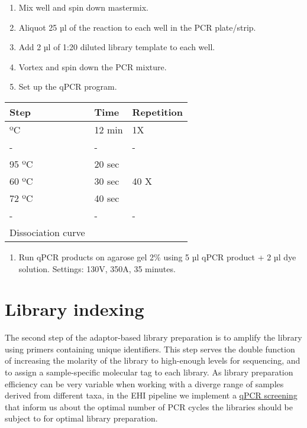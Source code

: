 \documentclass[
]{book}
\providecommand{\tightlist}{%
  \setlength{\itemsep}{0pt}\setlength{\parskip}{0pt}}
\begin{document}
\begin{enumerate}
\def\labelenumi{\arabic{enumi}.}
\setcounter{enumi}{1}
\tightlist
\item
  Mix well and spin down mastermix.
\item
  Aliquot 25 µl of the reaction to each well in the PCR plate/strip.
\item
  Add 2 µl of 1:20 diluted library template to each well.
\item
  Vortex and spin down the PCR mixture.
\item
  Set up the qPCR program.
\end{enumerate}

\begin{longtable}[]{@{}lll@{}}
\toprule\noalign{}
Step & Time & Repetition \\
\midrule\noalign{}
\endhead
\bottomrule\noalign{}
\endlastfoot
95 ºC & 12 min & 1X \\
- & - & - \\
95 ºC & 20 sec & \\
60 ºC & 30 sec & 40 X \\
72 ºC & 40 sec & \\
- & - & - \\
Dissociation curve & & \\
\end{longtable}

\begin{enumerate}
\def\labelenumi{\arabic{enumi}.}
\setcounter{enumi}{6}
\tightlist
\item
  Run qPCR products on agarose gel 2\% using 5 µl qPCR product + 2 µl dye solution. Settings: 130V, 350A, 35 minutes.
\end{enumerate}

\hypertarget{library-indexing}{%
\chapter{Library indexing}\label{library-indexing}}

The second step of the adaptor-based library preparation is to amplify the library using primers containing unique identifiers. This step serves the double function of increasing the molarity of the library to high-enough levels for sequencing, and to assign a sample-specific molecular tag to each library. As library preparation efficiency can be very variable when working with a diverge range of samples derived from different taxa, in the EHI pipeline we implement a \protect\hyperlink{library-preparation-qpcr}{qPCR screening} that inform us about the optimal number of PCR cycles the libraries should be subject to for optimal library preparation.
\end{document}
